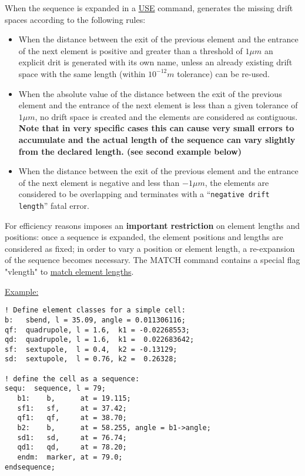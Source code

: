 When the sequence is expanded in a
\href{../control/general.html#use}{USE} command, \madx
generates the missing drift spaces according to the following rules:
\begin{itemize}
\item When the distance between the exit of the previous element and the
  entrance of the next element is positive and greater than a threshold
  of $1 \mu m$ an explicit drit is generated with its own name, unless
  an already existing drift space with the same length (within $10^{-12}
  m$ tolerance) can be re-used.
\item When the absolute value of the distance between the exit of the 
  previous element and the entrance of the next element is less than a
  given tolerance of $1\mu m$, no drift space is created and the
  elements are considered as contiguous. \\
  {\bf Note that in very specific cases this can cause very small errors
    to accumulate and the actual length of the sequence can vary
    slightly from the declared length. (see second example below)} 
\item When the distance between the exit of the previous element and the 
  entrance of the next element is negative and less than $-1\mu m$,
  the elements are considered to be overlapping and \madx terminates
  with a ``{\tt negative drift length}'' fatal error. 
\end{itemize} 

For efficiency reasons \madx imposes an \textbf{important restriction}
on element lengths and positions: once a sequence is expanded, the
element positions and lengths are considered as fixed; in order to vary
a position or element length, a re-expansion of the sequence becomes
necessary. The MATCH command contains a special flag "vlength" to
\href{../match/match.html}{match element lengths}.  

\href{example}{Example:}
\begin{verbatim}
! Define element classes for a simple cell:
b:   sbend, l = 35.09, angle = 0.011306116;
qf:  quadrupole, l = 1.6,  k1 = -0.02268553;
qd:  quadrupole, l = 1.6,  k1 =  0.022683642;
sf:  sextupole,  l = 0.4,  k2 = -0.13129;
sd:  sextupole,  l = 0.76, k2 =  0.26328;

! define the cell as a sequence:
sequ:  sequence, l = 79;
   b1:    b,      at = 19.115;
   sf1:   sf,     at = 37.42;
   qf1:   qf,     at = 38.70;
   b2:    b,      at = 58.255, angle = b1->angle;
   sd1:   sd,     at = 76.74;
   qd1:   qd,     at = 78.20;
   endm:  marker, at = 79.0;
endsequence;
\end{verbatim}




